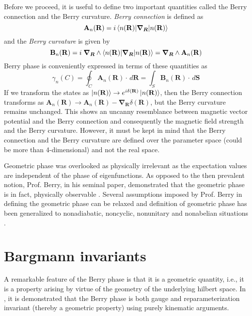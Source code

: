 Before we proceed, it is useful to define two important quantities called the Berry connection and the Berry curvature. \emph{Berry connection} is defined as
\begin{equation}
 \mathbf{A}_{n}(\mathbf{R}) = i\braket{n(\mathbf{R})| \bm{\nabla_{R}} | n(\mathbf{R})}
\end{equation}
and the \emph{Berry curvature} is given by
\begin{equation}
 \mathbf{B}_{n}(\mathbf{R}) = i \;\bm{\nabla_{R}} \wedge \braket{n(\mathbf{R})| \bm{\nabla_{R}} | n(\mathbf{R})} = \bm{\nabla_{R}} \wedge \mathbf{A}_{n}(\mathbf{R})
\end{equation} Berry phase is conveniently expressed in terms of these quantities as
\begin{equation}
 \gamma_{n}(C)= \oint_{C}{\mathbf{A}_{n}(\mathbf{R})\cdot \, d\mathbf{R}} = \int_{S}{\mathbf{B}_{n}(\mathbf{R})\cdot \, d\mathbf{S}}
\end{equation}
If we transform the states as $\ket{n(\mathbf{R})} \rightarrow e^{i\delta(\mathbf{R})} \ket{n(\mathbf{R})}$, then the Berry connection transforms as
$\mathbf{A}_{n}(\mathbf{R}) \rightarrow \mathbf{A}_{n}(\mathbf{R}) - \bm{\nabla_{R}} \delta(\mathbf{R})$, but the Berry curvature remains unchanged. This shows an uncanny
resemblance between magnetic vector potential and the Berry connection and consequently the magnetic field strength and the Berry curvature. However, it must be kept in mind that
the Berry connection and the Berry curvature are defined over the parameter space (could be more than 4-dimensional) and not the real space.

Geometric phase was overlooked as physically irrelevant as the expectation values are independent of the phase of eigenfunctions. 
As opposed to the then prevalent notion, Prof. Berry, in his seminal paper, demonstrated that the geometric phase is in fact, physically observable \cite{berry1984quantal,wilczek1989geometric}.
Several assumptions imposed by Prof. Berry in defining the geometric phase can be relaxed and definition of geometric phase has been generalized to nonadiabatic, noncyclic, 
nonunitary and nonabelian situations \cite{aharonov1987phase, samuel1988general, wilczek1984appearance, mukunda1993quantum}.

\section{Bargmann invariants}
A remarkable feature of the Berry phase is that it is a geometric quantity, i.e., it is a property arising by virtue of the geometry of the 
underlying hilbert space. In \parencite{mukunda1993quantum}, it is demonstrated that the Berry phase is both gauge and reparameterization 
invariant (thereby a geometric property) using purely kinematic arguments.

